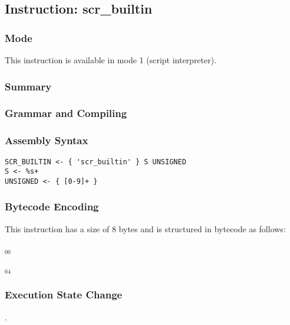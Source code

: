 \subsection{Instruction: scr\_builtin}

\subsubsection{Mode}
This instruction is available in mode 1 (script interpreter).
\subsubsection{Summary}


\subsubsection{Grammar and Compiling}


\subsubsection{Assembly Syntax}

\begin{myquote}
\begin{verbatim}
SCR_BUILTIN <- { 'scr_builtin' } S UNSIGNED
S <- %s+
UNSIGNED <- { [0-9]+ }
\end{verbatim}
\end{myquote}

\subsubsection{Bytecode Encoding}

This instruction has a size of 8 bytes and is structured in bytecode as follows:

$_{00}$\ 



$_{04}$\ 

\subsubsection{Execution State Change}

.


